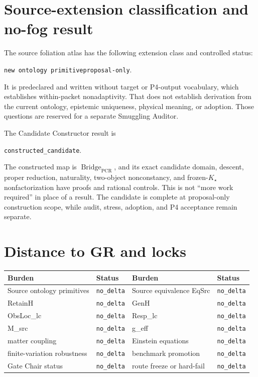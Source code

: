 \documentclass[11pt]{article}
\newcommand{\Kstar}{K_{\star}}
\newcommand{\Bridge}{\operatorname{Bridge}_{\mathrm{PCR}}}
\newcommand{\NoDelta}{\texttt{no\_delta}}
\begin{document}
\section{Source-extension classification and no-fog result}

The source foliation atlas has the following extension class and controlled
status:
\begin{center}
\texttt{new ontology primitive}\qquad\texttt{proposal-only}.
\end{center}
It is predeclared and written without target or P4-output vocabulary, which
establishes within-packet nonadaptivity.  That does not establish derivation
from the current ontology, epistemic uniqueness, physical meaning, or
adoption.  Those questions are reserved for a separate Smuggling Auditor.

The Candidate Constructor result is
\begin{center}
\texttt{constructed\_candidate}.
\end{center}
The constructed map is $\Bridge$, and its exact candidate domain, descent,
proper reduction, naturality, two-object nonconstancy, and frozen-$\Kstar$
nonfactorization have proofs and rational controls.  This is not ``more work
required'' in place of a result.  The candidate is complete at proposal-only
construction scope, while audit, stress, adoption, and P4 acceptance remain
separate.

\section{Distance to GR and locks}

\begin{center}
\small
\begin{tabular}{ll@{\qquad}ll}
\toprule
Burden & Status & Burden & Status \\
\midrule
Source ontology primitives & \NoDelta & Source equivalence EqSrc & \NoDelta \\
RetainH & \NoDelta & GenH & \NoDelta \\
ObsLoc\_lc & \NoDelta & Resp\_lc & \NoDelta \\
M\_src & \NoDelta & g\_eff & \NoDelta \\
matter coupling & \NoDelta & Einstein equations & \NoDelta \\
finite-variation robustness & \NoDelta & benchmark promotion & \NoDelta \\
Gate Chair status & \NoDelta & route freeze or hard-fail & \NoDelta \\
\bottomrule
\end{tabular}
\end{center}
\end{document}
